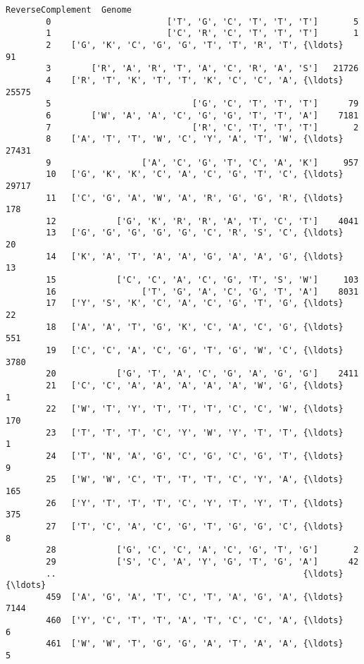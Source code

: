 \documentclass[11pt]{article}
\begin{document}
\begin{Verbatim}[commandchars=\\\{\}]
                                             ReverseComplement  Genome  
        0                       ['T', 'G', 'C', 'T', 'T', 'T']       5  
        1                       ['C', 'R', 'C', 'T', 'T', 'T']       1  
        2    ['G', 'K', 'C', 'G', 'G', 'T', 'T', 'R', 'T', {\ldots}      91  
        3        ['R', 'A', 'R', 'T', 'A', 'C', 'R', 'A', 'S']   21726  
        4    ['R', 'T', 'K', 'T', 'T', 'K', 'C', 'C', 'A', {\ldots}   25575  
        5                            ['G', 'C', 'T', 'T', 'T']      79  
        6        ['W', 'A', 'A', 'C', 'G', 'G', 'T', 'T', 'A']    7181  
        7                            ['R', 'C', 'T', 'T', 'T']       2  
        8    ['A', 'T', 'T', 'W', 'C', 'Y', 'A', 'T', 'W', {\ldots}   27431  
        9                  ['A', 'C', 'G', 'T', 'C', 'A', 'K']     957  
        10   ['G', 'K', 'K', 'C', 'A', 'C', 'G', 'T', 'C', {\ldots}   29717  
        11   ['C', 'G', 'A', 'W', 'A', 'R', 'G', 'G', 'R', {\ldots}     178  
        12            ['G', 'K', 'R', 'R', 'A', 'T', 'C', 'T']    4041  
        13   ['G', 'G', 'G', 'G', 'G', 'C', 'R', 'S', 'C', {\ldots}      20  
        14   ['K', 'A', 'T', 'A', 'A', 'G', 'A', 'A', 'G', {\ldots}      13  
        15            ['C', 'C', 'A', 'C', 'G', 'T', 'S', 'W']     103  
        16                 ['T', 'G', 'A', 'C', 'G', 'T', 'A']    8031  
        17   ['Y', 'S', 'K', 'C', 'A', 'C', 'G', 'T', 'G', {\ldots}      22  
        18   ['A', 'A', 'T', 'G', 'K', 'C', 'A', 'C', 'G', {\ldots}     551  
        19   ['C', 'C', 'A', 'C', 'G', 'T', 'G', 'W', 'C', {\ldots}    3780  
        20            ['G', 'T', 'A', 'C', 'G', 'A', 'G', 'G']    2411  
        21   ['C', 'C', 'A', 'A', 'A', 'A', 'A', 'W', 'G', {\ldots}       1  
        22   ['W', 'T', 'Y', 'T', 'T', 'T', 'C', 'C', 'W', {\ldots}     170  
        23   ['T', 'T', 'T', 'C', 'Y', 'W', 'Y', 'T', 'T', {\ldots}       1  
        24   ['T', 'N', 'A', 'G', 'C', 'G', 'C', 'G', 'T', {\ldots}       9  
        25   ['W', 'W', 'C', 'T', 'T', 'T', 'C', 'Y', 'A', {\ldots}     165  
        26   ['Y', 'T', 'T', 'T', 'C', 'Y', 'T', 'Y', 'T', {\ldots}     375  
        27   ['T', 'C', 'A', 'C', 'G', 'T', 'G', 'G', 'C', {\ldots}       8  
        28            ['G', 'C', 'C', 'A', 'C', 'G', 'T', 'G']       2  
        29            ['S', 'C', 'A', 'Y', 'G', 'T', 'G', 'A']      42  
        ..                                                 {\ldots}     {\ldots}  
        459  ['A', 'G', 'A', 'T', 'C', 'T', 'A', 'G', 'A', {\ldots}    7144  
        460  ['Y', 'C', 'T', 'T', 'A', 'T', 'C', 'C', 'A', {\ldots}       6  
        461  ['W', 'W', 'T', 'G', 'G', 'A', 'T', 'A', 'A', {\ldots}       5  

\end{Verbatim}
\end{document}
